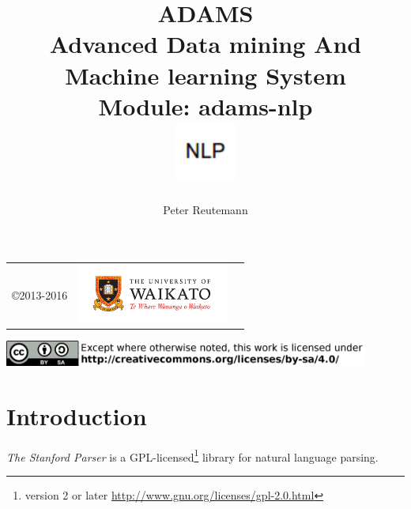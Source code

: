 \documentclass[a4paper]{book}
\title{
  \textbf{ADAMS} \\
  {\Large \textbf{A}dvanced \textbf{D}ata mining \textbf{A}nd \textbf{M}achine
  learning \textbf{S}ystem} \\
  {\Large Module: adams-nlp} \\
  \vspace{1cm}
  \includegraphics[width=2cm]{images/nlp-module.png} \\
}
\author{
  Peter Reutemann
}
\begin{document}
\begin{titlepage}
\maketitle

\thispagestyle{empty}
\center
\begin{table}[b]
	\begin{tabular}{c l l}
		\parbox[c][2cm]{2cm}{\copyright 2013-2016} &
		\parbox[c][2cm]{5cm}{\includegraphics[width=5cm]{images/coat_of_arms.pdf}} \\
	\end{tabular}
	\includegraphics[width=12cm]{images/cc.png} \\
\end{table}

\end{titlepage}

\tableofcontents
\listoffigures

\chapter{Introduction}
\textit{The Stanford Parser} is a GPL-licensed\footnote{version 2 or later \url{http://www.gnu.org/licenses/gpl-2.0.html}{}} 
library for natural language parsing.
\end{document}
